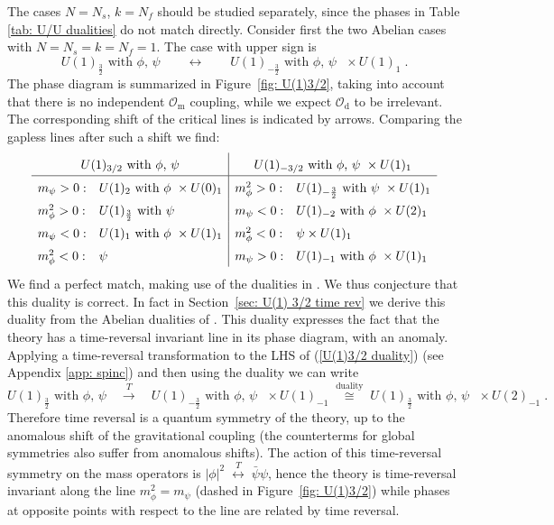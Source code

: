 \documentclass[a4paper, 12pt]{article}
\numberwithin{equation}{section}
\newcommand{\be}{\begin{equation}} \newcommand{\ee}{\end{equation}}
\newcommand{\cO}{\mathcal{O}}
\begin{document}
The cases $N=N_s$, $k = N_f$ should be studied separately, since the phases in Table \ref{tab: U/U dualities} do not match directly. Consider first the two Abelian cases with $N=N_s = k = N_f = 1$. The case with upper sign is
\be
\label{U(1)3/2 duality}
U(1)_{\frac32} \text{ with $\phi$, $\psi$} \qquad\longleftrightarrow\qquad U(1)_{-\frac32} \text{ with $\phi$, $\psi$ } \times U(1)_1 \;.
\ee
The phase diagram is summarized in Figure~\ref{fig: U(1)3/2}, taking into account that there is no independent $\cO_\text{m}$ coupling, while we expect $\cO_\text{d}$ to be irrelevant. The corresponding shift of the critical lines is indicated by arrows. Comparing the gapless lines after such a shift we find:
\be
\label{scheme deformations U(1)3/2}
{\renewcommand{\arraystretch}{1.5}
\begin{array}{ll|ll}
\multicolumn{2}{c|}{U(1)_{3/2} \text{ with $\phi$, $\psi$}} & \multicolumn{2}{c}{U(1)_{-3/2} \text{ with $\phi$, $\psi$ } \times U(1)_1} \\
\hline
m_\psi>0: & U(1)_2 \text{ with $\phi$ } \times U(0)_1 & m_\phi^2>0: & U(1)_{-\frac32} \text{ with $\psi$ } \times U(1)_1 \\
m_\phi^2>0: & U(1)_\frac32 \text{ with $\psi$ } & m_\psi<0: & U(1)_{-2} \text{ with $\phi$ } \times U(2)_1 \\
m_\psi<0: & U(1)_1 \text{ with $\phi$ } \times U(1)_1 & m_\phi^2<0: & \psi \times U(1)_1 \\
m_\phi^2<0: & \psi & m_\psi>0: & U(1)_{-1} \text{ with $\phi$ } \times U(1)_1
\end{array}}
\ee
We find a perfect match, making use of the dualities in \cite{Seiberg:2016gmd, Hsin:2016blu}. We thus conjecture that this duality is correct. In fact in Section~\ref{sec: U(1) 3/2 time rev} we derive this duality from the Abelian dualities of \cite{Seiberg:2016gmd}. This duality expresses the fact that the theory has a time-reversal invariant line in its phase diagram, with an anomaly. Applying a time-reversal transformation to the LHS of (\ref{U(1)3/2 duality}) (see Appendix \ref{app: spinc}) and then using the duality we can write
\be
U(1)_\frac32 \text{ with $\phi$, $\psi$} \quad\stackrel{T}{\longrightarrow}\quad U(1)_{-\frac32} \text{ with $\phi$, $\psi$ } \times U(1)_{-1} \;\stackrel{\text{duality}}{\cong}\; U(1)_\frac32 \text{ with $\phi$, $\psi$ } \times U(2)_{-1} \;.
\ee
Therefore time reversal is a quantum symmetry of the theory, up to the anomalous shift of the gravitational coupling (the counterterms for global symmetries also suffer from anomalous shifts). The action of this time-reversal symmetry on the mass operators is $|\phi|^2 \;\stackrel{T}{\longleftrightarrow}\; \bar\psi\psi$, hence the theory is time-reversal invariant along the line $m_\phi^2 = m_\psi$ (dashed in Figure~\ref{fig: U(1)3/2}) while phases at opposite points with respect to the line are related by time reversal.
\end{document}
